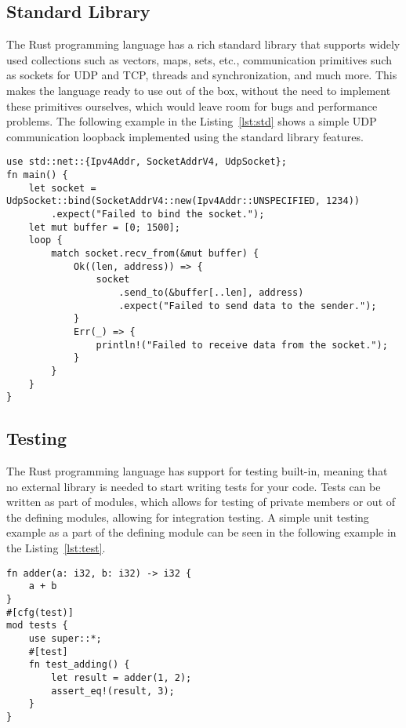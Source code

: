 \newpage
\subsection{Standard Library}
\label{subsec:std_lib}
The Rust programming language has a rich standard library that supports widely used collections such as vectors, maps, sets, etc., communication primitives such as sockets for UDP and TCP, threads and synchronization, and much more.
This makes the language ready to use out of the box, without the need to implement these primitives ourselves, which would leave room for bugs and performance problems.
The following example in the Listing~\ref{lst:std} shows a simple UDP communication loopback implemented using the standard library features.

\begin{lstlisting}[caption={Using Rust standard library to implement UDP loopback.},label=lst:std]
use std::net::{Ipv4Addr, SocketAddrV4, UdpSocket};
fn main() {
    let socket = UdpSocket::bind(SocketAddrV4::new(Ipv4Addr::UNSPECIFIED, 1234))
        .expect("Failed to bind the socket.");
    let mut buffer = [0; 1500];
    loop {
        match socket.recv_from(&mut buffer) {
            Ok((len, address)) => {
                socket
                    .send_to(&buffer[..len], address)
                    .expect("Failed to send data to the sender.");
            }
            Err(_) => {
                println!("Failed to receive data from the socket.");
            }
        }
    }
}
\end{lstlisting}

\newpage
\subsection{Testing}
\label{subsec:testing}
The Rust programming language has support for testing built-in, meaning that no external library is needed to start writing tests for your code.
Tests can be written as part of modules, which allows for testing of private members or out of the defining modules, allowing for integration testing.
A simple unit testing example as a part of the defining module can be seen in the following example in the Listing~\ref{lst:test}.

\begin{lstlisting}[caption={Writing in-module tests for Rust members.},label=lst:test]
fn adder(a: i32, b: i32) -> i32 {
    a + b
}
#[cfg(test)]
mod tests {
    use super::*;
    #[test]
    fn test_adding() {
        let result = adder(1, 2);
        assert_eq!(result, 3);
    }
}
\end{lstlisting}

